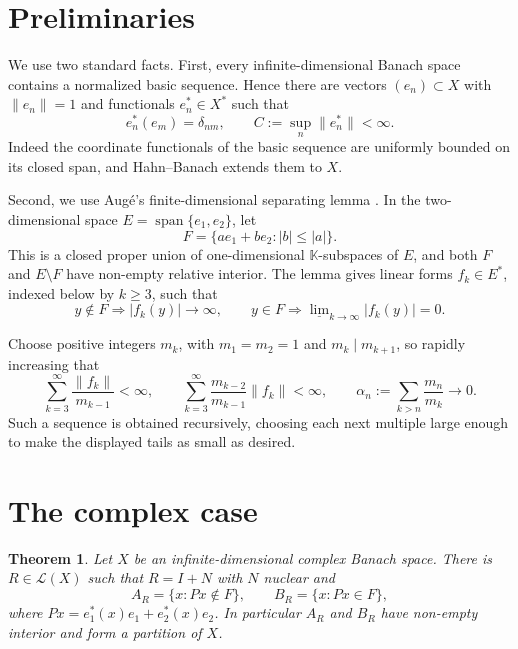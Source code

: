 \documentclass[11pt]{article}
\newtheorem{theorem}{Theorem}
\newcommand{\K}{\mathbb K}
\newcommand{\cL}{\mathcal L}
\newcommand{\liminfn}{\underline{\lim}}
\begin{document}
\section{Preliminaries}

We use two standard facts.  First, every infinite-dimensional Banach space
contains a normalized basic sequence.  Hence there are vectors
\((e_n)\subset X\) with \(\|e_n\|=1\) and functionals \(e_n^*\in X^*\) such
that
\[
  e_n^*(e_m)=\delta_{nm},
  \qquad C:=\sup_n\|e_n^*\|<\infty .
\]
Indeed the coordinate functionals of the basic sequence are uniformly bounded
on its closed span, and Hahn--Banach extends them to \(X\).

Second, we use Aug\'e's finite-dimensional separating lemma
\cite[Proposition 2.1]{Auge}.  In the two-dimensional space
\(E=\operatorname{span}\{e_1,e_2\}\), let
\[
  F=\{a e_1+b e_2: |b|\le |a|\}.
\]
This is a closed proper union of one-dimensional \(\K\)-subspaces of \(E\),
and both \(F\) and \(E\setminus F\) have non-empty relative interior.  The
lemma gives linear forms \(f_k\in E^*\), indexed below by \(k\ge 3\), such
that
\[
  y\notin F \Rightarrow |f_k(y)|\to\infty,
  \qquad
  y\in F \Rightarrow \liminfn_{k\to\infty}|f_k(y)|=0 .
\]

Choose positive integers \(m_k\), with \(m_1=m_2=1\) and \(m_k\mid m_{k+1}\),
so rapidly increasing that
\begin{equation}\label{eq:growth}
  \sum_{k=3}^\infty \frac{\|f_k\|}{m_{k-1}}<\infty,\qquad
  \sum_{k=3}^\infty \frac{m_{k-2}}{m_{k-1}}\|f_k\|<\infty,\qquad
  \alpha_n:=\sum_{k>n}\frac{m_n}{m_k}\longrightarrow 0 .
\end{equation}
Such a sequence is obtained recursively, choosing each next multiple large
enough to make the displayed tails as small as desired.

\section{The complex case}

\begin{theorem}\label{thm:complex}
Let \(X\) be an infinite-dimensional complex Banach space.  There is
\(R\in\cL(X)\) such that \(R=I+N\) with \(N\) nuclear and
\[
  A_R=\{x:Px\notin F\},\qquad B_R=\{x:Px\in F\},
\]
where \(P x=e_1^*(x)e_1+e_2^*(x)e_2\).  In particular \(A_R\) and \(B_R\)
have non-empty interior and form a partition of \(X\).
\end{theorem}
\end{document}
